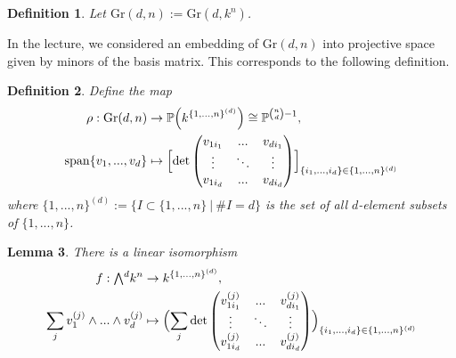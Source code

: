 \documentclass{scrartcl}
\newcommand{\Proj}{\mathbb{P}}
\newcommand{\Gr}{\mathrm{Gr}}
\newcommand{\extpow}{\mathchoice{{\textstyle\bigwedge}}
    {{\bigwedge}}
    {{\textstyle\wedge}}
    {{\scriptstyle\wedge}}}
\newcommand{\vspan}{\mathrm{span}}
\newtheorem{definition}{Definition}
\newtheorem{lemma}[definition]{Lemma}
\begin{document}
\begin{definition}
    Let $\Gr(d, n) := \Gr(d, k^n)$.
\end{definition}
In the lecture, we considered an embedding of $\Gr(d, n)$ into projective space given by minors of the basis matrix.
This corresponds to the following definition.
\begin{definition}
    Define the map
    \begin{align*}
        \rho: \Gr(d, n) &\to \Proj\Bigl(k^{\{1, ..., n\}^{(d)}}\Bigr) \cong \Proj^{{n \choose d} - 1}, \\
        \vspan\{v_1, ..., v_d\} &\mapsto \Bigl[ \det\left(\begin{matrix}
            v_{1i_1} & ... & v_{di_1} \\
            \vdots & \ddots & \vdots \\
            v_{1i_d} & ... & v_{di_d}
        \end{matrix}\right) \Bigr]_{\{i_1, ..., i_d\} \in \{1, ..., n\}^{(d)}}
    \end{align*}
    where $\{1, ..., n\}^{(d)} := \{ I \subset \{1, ..., n\} \ | \ \#I = d \}$ is the set of all $d$-element subsets of $\{1, ..., n\}$.
\end{definition}
\begin{lemma}
    There is a linear isomorphism
    \begin{align*}
        f: \extpow^d k^n &\to k^{\{1, ..., n\}^{(d)}}, \\
        \sum_j v_1^{(j)} \wedge ... \wedge v_d^{(j)} &\mapsto \Bigl( \sum_j \det\left(\begin{matrix}
            v_{1i_1}^{(j)} & ... & v_{di_1}^{(j)} \\
            \vdots & \ddots & \vdots \\
            v_{1i_d}^{(j)} & ... & v_{di_d}^{(j)}
        \end{matrix}\right) \Bigr)_{\{i_1, ..., i_d\} \in \{1, ..., n\}^{(d)}}
    \end{align*}
\end{lemma}
\end{document}
